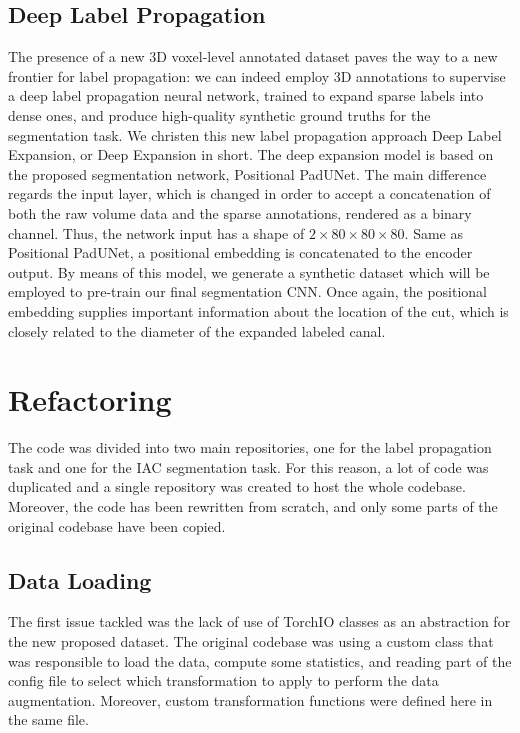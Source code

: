 \subsection{Deep Label Propagation}
The presence of a new 3D voxel-level annotated dataset paves the way to a new
frontier for label propagation: we can indeed employ 3D annotations to supervise
a deep label propagation neural network, trained to expand sparse labels into
dense ones, and produce high-quality synthetic ground truths for the
segmentation task. We christen this new label propagation approach Deep Label
Expansion, or Deep Expansion in short. The deep expansion model is based on the
proposed segmentation network, Positional PadUNet. The main difference regards
the input layer, which is changed in order to accept a concatenation of both the
raw volume data and the sparse annotations, rendered as a binary channel. Thus,
the network input has a shape of $2 \times 80 \times 80 \times 80$. Same as
Positional PadUNet, a positional embedding is concatenated to the encoder
output. By means of this model, we generate a synthetic dataset which will be
employed to pre-train our final segmentation CNN. Once again, the positional
embedding supplies important information about the location of the cut, which is
closely related to the diameter of the expanded labeled canal.

\section{Refactoring}
The code was divided into two main repositories, one for the 
label propagation task and
one for the IAC segmentation task. For this reason, a lot of code was duplicated and
a single repository was created to host the whole codebase. Moreover, the code has been
rewritten from scratch, and only some parts of the original codebase have been
copied.

\subsection{Data Loading}
The first issue tackled was the lack of use of TorchIO classes as an abstraction
for the new proposed dataset. The original codebase was using a custom class that
was responsible to load the data, compute some statistics, and reading part of
the config file to select which transformation to apply to perform the data
augmentation. Moreover, custom transformation functions were defined here in the
same file.

